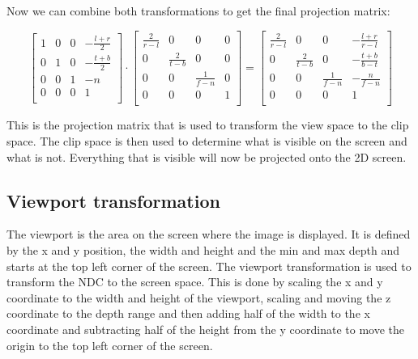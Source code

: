 \documentclass[12pt]{report} \usepackage{preamble}
\begin{document}
Now we can combine both transformations to get the final projection matrix:

\[
	\begin{bmatrix}
		1 & 0 & 0 & -\frac{l + r}{2} \\
		0 & 1 & 0 & -\frac{t + b}{2} \\
		0 & 0 & 1 & -n               \\
		0 & 0 & 0 & 1                \\
	\end{bmatrix}
	\cdot
	\begin{bmatrix}
		\frac{2}{r - l} & 0               & 0               & 0 \\
		0               & \frac{2}{t - b} & 0               & 0 \\
		0               & 0               & \frac{1}{f - n} & 0 \\
		0               & 0               & 0               & 1 \\
	\end{bmatrix}
	=
	\begin{bmatrix}
		\frac{2}{r - l} & 0               & 0               & -\frac{l + r}{r - l} \\
		0               & \frac{2}{t - b} & 0               & -\frac{t + b}{b - t} \\
		0               & 0               & \frac{1}{f - n} & -\frac{n}{f - n}     \\
		0               & 0               & 0               & 1                    \\
	\end{bmatrix}
\]

This is the projection matrix that is used to transform the view space to the clip space.
The clip space is then used to determine what is visible on the screen and what is not.
Everything that is visible will now be projected onto the 2D screen.

\subsection{Viewport transformation}

The viewport is the area on the screen where the image is displayed.
It is defined by the x and y position, the width and height and the
min and max depth and starts at the top left corner of the screen.
The viewport transformation is used to transform the \ac{NDC} to the screen space.
This is done by scaling the x and y coordinate to the width and height of the viewport,
scaling and moving the z coordinate to the depth range and then adding
half of the width to the x coordinate and subtracting half of the height from the y coordinate
to move the origin to the top left corner of the screen.
\end{document}
